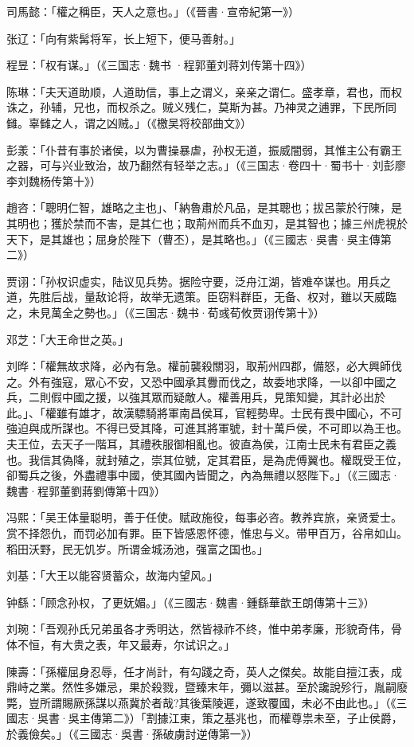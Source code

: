 司馬懿：「權之稱臣，天人之意也。」（《晉書·宣帝紀第一》）

张辽：「向有紫髯将军，长上短下，便马善射。」

程昱：「权有谋。」（《三国志·魏书 ·程郭董刘蒋刘传第十四》）

陈琳：「夫天道助顺，人道助信，事上之谓义，亲亲之谓仁。盛孝章，君也，而权诛之，孙辅，兄也，而权杀之。贼义残仁，莫斯为甚。乃神灵之逋罪，下民所同雠。辜雠之人，谓之凶贼。」（《檄吴将校部曲文》）

彭羕：「仆昔有事於诸侯，以为曹操暴虐，孙权无道，振威闇弱，其惟主公有霸王之器，可与兴业致治，故乃翻然有轻举之志。」（《三国志·卷四十·蜀书十·刘彭廖李刘魏杨传第十》）

趙咨：「聰明仁智，雄略之主也」、「納魯肅於凡品，是其聰也；拔呂蒙於行陳，是其明也；獲於禁而不害，是其仁也；取荊州而兵不血刃，是其智也；據三州虎視於天下，是其雄也；屈身於陛下（曹丕），是其略也。」（《三國志·吳書·吳主傳第二》）

贾诩：「孙权识虚实，陆议见兵势。据险守要，泛舟江湖，皆难卒谋也。用兵之道，先胜后战，量敌论将，故举无遗策。臣窃料群臣，无备、权对，雖以天威臨之，未見萬全之勢也。」（《三国志·魏书·荀彧荀攸贾诩传第十》）

邓芝：「大王命世之英。」

刘晔：「權無故求降，必內有急。權前襲殺關羽，取荊州四郡，備怒，必大興師伐之。外有強寇，眾心不安，又恐中國承其釁而伐之，故委地求降，一以卻中國之兵，二則假中國之援，以強其眾而疑敵人。權善用兵，見策知變，其計必出於此。」、「權雖有雄才，故漢驃騎將軍南昌侯耳，官輕勢卑。士民有畏中國心，不可強迫與成所謀也。不得已受其降，可進其將軍號，封十萬戶侯，不可即以為王也。夫王位，去天子一階耳，其禮秩服御相亂也。彼直為侯，江南士民未有君臣之義也。我信其偽降，就封殖之，崇其位號，定其君臣，是為虎傅翼也。權既受王位，卻蜀兵之後，外盡禮事中國，使其國內皆聞之，內為無禮以怒陛下。」（《三國志·魏書·程郭董劉蔣劉傳第十四》）

冯熙：「吴王体量聪明，善于任使。赋政施役，每事必咨。教养宾旅，亲贤爱士。赏不择怨仇，而罚必加有罪。臣下皆感恩怀德，惟忠与义。带甲百万，谷帛如山。稻田沃野，民无饥岁。所谓金城汤池，强富之国也。」

刘基：「大王以能容贤蓄众，故海内望风。」

钟繇：「顾念孙权，了更妩媚。」（《三國志·魏書·鍾繇華歆王朗傳第十三》）

刘琬：「吾观孙氏兄弟虽各才秀明达，然皆禄祚不终，惟中弟孝廉，形貌奇伟，骨体不恒，有大贵之表，年又最寿，尔试识之。」

陳壽：「孫權屈身忍辱，任才尚計，有勾踐之奇，英人之傑矣。故能自擅江表，成鼎峙之業。然性多嫌忌，果於殺戮，暨臻末年，彌以滋甚。至於讒說殄行，胤嗣廢斃，豈所謂賜厥孫謀以燕冀於者哉?其後葉陵遲，遂致覆國，未必不由此也。」（《三國志·吳書·吳主傳第二》）「割據江東，策之基兆也，而權尊祟未至，子止侯爵，於義儉矣。」（《三國志·吳書·孫破虜討逆傳第一》）

